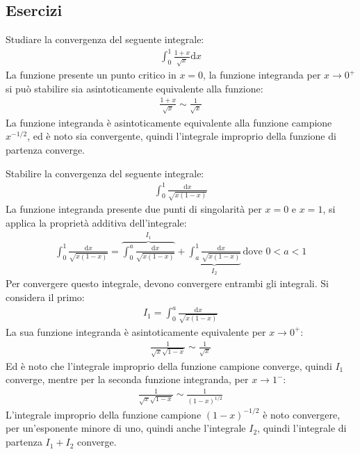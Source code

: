 \documentclass{article}
\numberwithin{equation}{subsection}
\begin{document}
\subsection{Esercizi}

Studiare la convergenza del seguente integrale:
\begin{gather*}
\displaystyle\int_0^1\frac{1+x}{\sqrt{x}}\mathrm{d}x
\end{gather*}
La funzione presente un punto critico in $x=0$, la funzione integranda per $x\to0^+$ si può stabilire sia asintoticamente equivalente alla funzione:
\begin{gather*}
    \displaystyle\frac{1+x}{\sqrt{x}}\sim\frac{1}{\sqrt{x}}
\end{gather*}
La funzione integranda è asintoticamente equivalente alla funzione campione $x^{-1/2}$, ed è noto sia convergente, quindi l'integrale improprio della funzione di partenza converge. 


Stabilire la convergenza del seguente integrale:
\begin{gather*}
    \displaystyle\int_0^1\frac{\mathrm{d}x}{\sqrt{x(1-x)}}
\end{gather*}
La funzione integranda presente due punti di singolarità per $x=0$ e $x=1$, si applica la proprietà additiva dell'integrale:
\begin{gather*}
    \displaystyle\int_0^1\frac{\mathrm{d}x}{\sqrt{x(1-x)}}=
    \overbrace{\int_0^a\frac{\mathrm{d}x}{\sqrt{x(1-x)}}}^{I_1}+
    \underbrace{\int_a^1\frac{\mathrm{d}x}{\sqrt{x(1-x)}}}_{I_2}\,\mbox{dove }0<a<1
\end{gather*}
Per convergere questo integrale, devono convergere entrambi gli integrali. Si considera il primo:
\begin{gather*}
    I_1=\displaystyle\int_0^a\frac{\mathrm{d}x}{\sqrt{x(1-x)}}
\end{gather*}
La sua funzione integranda è asintoticamente equivalente per $x\to0^+$:
\begin{gather*}
    \displaystyle\frac{1}{\sqrt{x}\sqrt{1-x}}\sim\frac{1}{\sqrt{x}}
\end{gather*}
Ed è noto che l'integrale improprio della funzione campione converge, quindi $I_1$ converge, mentre per la seconda funzione integranda, per $x\to1^-$:
\begin{gather*}
    \displaystyle\frac{1}{\sqrt{x}\sqrt{1-x}}\sim\frac{1}{(1-x)^{1/2}}
\end{gather*}
L'integrale improprio della funzione campione $(1-x)^{-1/2}$ è noto convergere, per un'esponente minore di uno, quindi anche l'integrale $I_2$, quindi l'integrale di partenza $I_1+I_2$ converge. 
\end{document}
